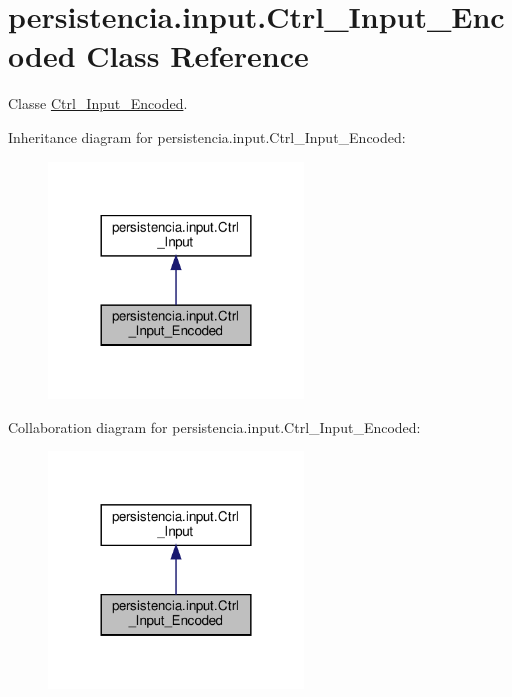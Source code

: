 \hypertarget{classpersistencia_1_1input_1_1Ctrl__Input__Encoded}{}\section{persistencia.\+input.\+Ctrl\+\_\+\+Input\+\_\+\+Encoded Class Reference}
\label{classpersistencia_1_1input_1_1Ctrl__Input__Encoded}


Classe \hyperlink{classpersistencia_1_1input_1_1Ctrl__Input__Encoded}{Ctrl\+\_\+\+Input\+\_\+\+Encoded}.  




Inheritance diagram for persistencia.\+input.\+Ctrl\+\_\+\+Input\+\_\+\+Encoded\+:\nopagebreak
\begin{figure}[H]
\begin{center}
\leavevmode
\includegraphics[width=192pt]{classpersistencia_1_1input_1_1Ctrl__Input__Encoded__inherit__graph}
\end{center}
\end{figure}


Collaboration diagram for persistencia.\+input.\+Ctrl\+\_\+\+Input\+\_\+\+Encoded\+:\nopagebreak
\begin{figure}[H]
\begin{center}
\leavevmode
\includegraphics[width=192pt]{classpersistencia_1_1input_1_1Ctrl__Input__Encoded__coll__graph}
\end{center}
\end{figure}
